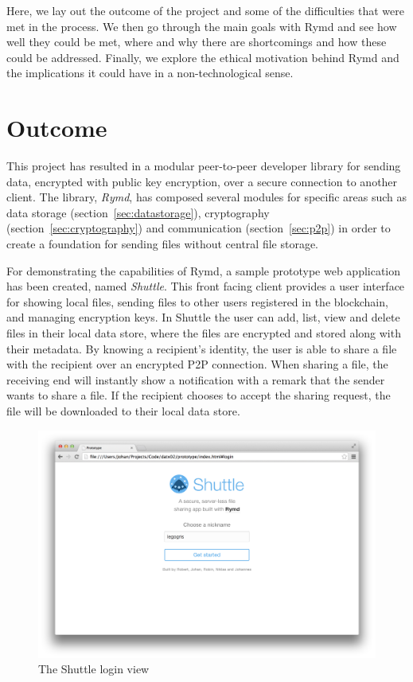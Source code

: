 
Here, we lay out the outcome of the project and some of the difficulties that were met in the process. We then go through the main goals with Rymd and see how well they could be met, where and why there are shortcomings and how these could be addressed. Finally, we explore the ethical motivation behind Rymd and the implications it could have in a non-technological sense.

\section{Outcome}
This project has resulted in a modular peer-to-peer developer library for sending data, encrypted with public key encryption, over a secure connection to another client. The library, \emph{Rymd}, has composed several modules for specific areas such as data storage (section~\ref{sec:datastorage}), cryptography (section~\ref{sec:cryptography}) and communication (section~\ref{sec:p2p}) in order to create a foundation for sending files without central file storage.

For demonstrating the capabilities of Rymd, a sample prototype web application has been created, named \emph{Shuttle}. This front facing client provides a user interface for showing local files, sending files to other users registered in the blockchain, and managing encryption keys. In Shuttle the user can add, list, view and delete files in their local data store, where the files are encrypted and stored along with their metadata. By knowing a recipient's identity, the user is able to share a file with the recipient over an encrypted P2P connection. When sharing a file, the receiving end will instantly show a notification with a remark that the sender wants to share a file. If the recipient chooses to accept the sharing request, the file will be downloaded to their local data store.

\begin{figure}[ht]
\centering
\includegraphics[width=\textwidth,height=0.2\paperheight,keepaspectratio
]{figures/shuttle-login}
\caption{The Shuttle login view}
\label{fig:shuttle-login}
\end{figure}

